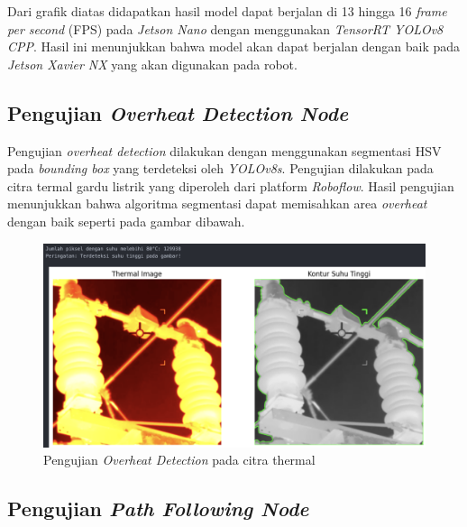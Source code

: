 Dari grafik diatas didapatkan hasil model dapat berjalan di 13 hingga 16 \emph{frame per second} (FPS) pada \emph{Jetson Nano} dengan menggunakan \emph{TensorRT YOLOv8 CPP}. Hasil ini menunjukkan bahwa model akan dapat berjalan dengan baik pada \emph{Jetson Xavier NX} yang akan digunakan pada robot. 

\subsection{Pengujian \emph{Overheat Detection Node}}
Pengujian \emph{overheat detection} dilakukan dengan menggunakan segmentasi HSV pada \emph{bounding box} yang terdeteksi oleh \emph{YOLOv8s}. Pengujian dilakukan pada citra termal gardu listrik yang diperoleh dari platform \emph{Roboflow}. Hasil pengujian menunjukkan bahwa algoritma segmentasi dapat memisahkan area \emph{overheat} dengan baik seperti pada gambar dibawah.
\begin{figure}[H] \centering 
    \includegraphics[scale=0.35]{gambar/thermal.png}
    \caption{Pengujian \emph{Overheat Detection} pada citra thermal}
    \label{fig:Overheat Detection pada Robot}
\end{figure}

\subsection{Pengujian \emph{Path Following Node}}

